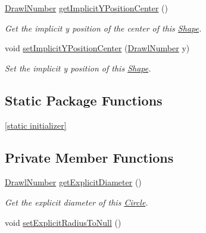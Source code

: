 \begin{DoxyCompactItemize}
\hyperlink{classcom_1_1aarrelaakso_1_1drawl_1_1_drawl_number}{Drawl\+Number} \hyperlink{classcom_1_1aarrelaakso_1_1drawl_1_1_shape_a0549739ee3201ae16091acce4ee6a5ac}{get\+Implicit\+Y\+Position\+Center} ()
\begin{DoxyCompactList}\small\item\em Get the implicit y position of the center of this \hyperlink{classcom_1_1aarrelaakso_1_1drawl_1_1_shape}{Shape}. \end{DoxyCompactList}\item 
void \hyperlink{classcom_1_1aarrelaakso_1_1drawl_1_1_shape_ac49fa20747ea798a3b56c3ea99df2d8f}{set\+Implicit\+Y\+Position\+Center} (\hyperlink{classcom_1_1aarrelaakso_1_1drawl_1_1_drawl_number}{Drawl\+Number} y)
\begin{DoxyCompactList}\small\item\em Set the implicit y position of this \hyperlink{classcom_1_1aarrelaakso_1_1drawl_1_1_shape}{Shape}. \end{DoxyCompactList}\end{DoxyCompactItemize}
\subsection*{Static Package Functions}
\begin{DoxyCompactItemize}
\item 
\hyperlink{classcom_1_1aarrelaakso_1_1drawl_1_1_shape_ad2adcb85374cf5d6d59429628314e8d1}{\mbox{[}static initializer\mbox{]}}
\end{DoxyCompactItemize}
\subsection*{Private Member Functions}
\begin{DoxyCompactItemize}
\item 
\hyperlink{classcom_1_1aarrelaakso_1_1drawl_1_1_drawl_number}{Drawl\+Number} \hyperlink{classcom_1_1aarrelaakso_1_1drawl_1_1_circle_ab1971c353febd9bc5f5633e9b6e5611e}{get\+Explicit\+Diameter} ()
\begin{DoxyCompactList}\small\item\em Get the explicit diameter of this \hyperlink{classcom_1_1aarrelaakso_1_1drawl_1_1_circle}{Circle}. \end{DoxyCompactList}\item 
void \hyperlink{classcom_1_1aarrelaakso_1_1drawl_1_1_circle_aff1c4d184a3234f987a95b673f91bf18}{set\+Explicit\+Radius\+To\+Null} ()
\end{DoxyCompactItemize}
